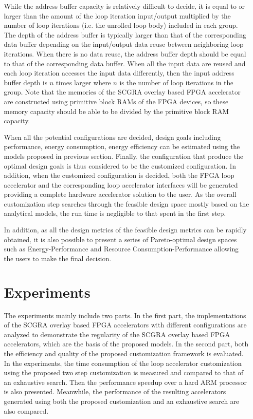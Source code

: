 While the address buffer capacity is relatively difficult to decide, it is equal to or larger than the amount of the loop iteration input/output multiplied by the number of loop iterations (i.e. the unrolled loop body) included in each group. The depth of the address buffer is typically larger than that of the corresponding data buffer depending on the input/output data reuse between neighboring loop iterations. When there is no data reuse, the address buffer depth should be equal to that of the corresponding data buffer. When all the input data are reused and each loop iteration accesses the input data differently, then the input address buffer depth is $n$ times larger where $n$ is the number of loop iterations in the group. Note that the memories of the SCGRA overlay based FPGA accelerator are constructed using primitive block RAMs of the FPGA devices, so these memory capacity should be able to be divided by the primitive block RAM capacity. 

When all the potential configurations are decided, design goals including performance, energy consumption, energy efficiency can be estimated using the models proposed in previous section. Finally, the configuration that produce the optimal design goals is thus considered to be the customized configuration. In addition, when the customized configuration is decided, both the FPGA loop accelerator and the corresponding loop accelerator interfaces will be generated providing a complete hardware accelerator solution to the user. As the overall customization step searches through the feasible design space mostly based on the analytical models, the run time is negligible to that spent in the first step.

In addition, as all the design metrics of the feasible design metrics can be rapidly obtained, it is also possible to present a series of Pareto-optimal design spaces such as Energy-Performance and Resource Consumption-Performance allowing the users to make the final decision. 

\section{Experiments}
The experiments mainly include two parts. In the first part, the implementations of the SCGRA overlay based FPGA accelerators with different configurations are analyzed to demonstrate the regularity of the SCGRA overlay based FPGA accelerators, which are the basis of the proposed models. In the second part, both the efficiency and quality of the proposed customization framework is evaluated. In the experiments, the time consumption of the loop accelerator customization using the proposed two step customization is measured and compared to that of an exhaustive search. Then the performance speedup over a hard ARM processor is also presented. Meanwhile, the performance of the resulting accelerators generated using both the proposed customization and an exhaustive search are also compared. 

